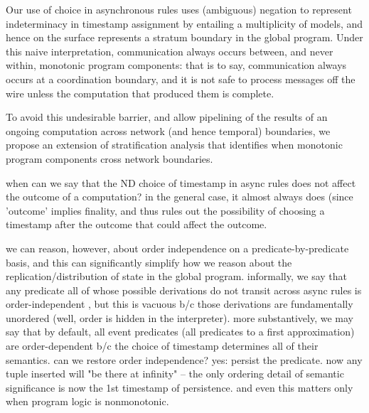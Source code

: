 Our use of choice in asynchronous rules uses (ambiguous) negation to represent indeterminacy
in timestamp assignment by entailing a multiplicity of models, and hence on the surface
represents a stratum boundary in the global
program.  Under this naive interpretation, communication always occurs between, and never
within, monotonic program components: that is to say, communication always occurs at a 
coordination boundary, and it is not safe to process messages off the wire unless the 
computation that produced them is complete.  

To avoid this undesirable barrier, and allow 
pipelining of the results of an ongoing computation across network (and hence temporal)
boundaries, we propose an extension of stratification analysis that identifies when 
monotonic program components cross network boundaries. 





when can we say that the ND choice of timestamp in async rules does not affect the outcome
of a computation?  in the general case, it almost always does (since 'outcome' implies finality,
and thus rules out the possibility of choosing a timestamp after the outcome that could affect the outcome.

we can reason, however, about order independence on a predicate-by-predicate basis, and this
can significantly simplify how we reason about the replication/distribution of state in the
global program.  informally, we say that any predicate all of whose possible derivations 
do not transit across async rules is order-independent , but this is vacuous b/c those derivations
are fundamentally unordered (well, order is hidden in the interpreter).  more substantively,
we may say that by default, all event predicates (all predicates to a first approximation) 
are order-dependent b/c the choice of timestamp determines all of their semantics.  
can we restore order independence?  yes: persist the predicate.  now any tuple inserted will
"be there at infinity" -- the only ordering detail of semantic significance is now the 1st 
timestamp of persistence.  and even this matters only when program logic is nonmonotonic. 

